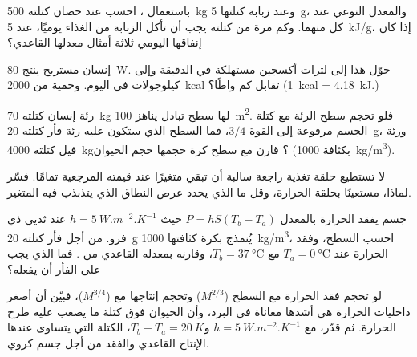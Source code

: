 \begin{exercise}[$\star\star$]\label{exo:b1:organism-environment:6}
باستعمال ، احسب  عند حصان كتلته
\qty{500}{kg} وعند زبابة كتلتها \qty{5}{g}، والمعدل النوعي عند كل
منهما. وكم مرة من كتلته يجب أن تأكل الزبابة من الغذاء يوميًا، عند
\qty{5}{kJ/g}، إذا كان إنفاقها اليومي ثلاثة أمثال معدلها القاعدي؟
\end{exercise}

\begin{exercise}[$\star\star$]\label{exo:b1:organism-environment:7}
إنسان مستريح ينتج \qty{80}{W}. حوّل هذا إلى لترات أكسجين مستهلكة في
الدقيقة وإلى كيلوجولات في اليوم. وحمية من \qty{2000}{kcal} تقابل كم
واطًا؟ (\qty{1}{kcal} = \qty{4.18}{kJ}.)
\end{exercise}

\begin{exercise}[$\star\star$]\label{exo:b1:organism-environment:8}
رئة إنسان كتلته \qty{70}{kg} لها سطح تبادل يناهز \qty{100}{m^2}.
فلو تحجم سطح الرئة مع كتلة الجسم مرفوعة إلى القوة $3/4$، فما السطح
الذي ستكون عليه رئة فأر كتلته \qty{20}{g}، ورئة فيل كتلته
\qty{4000}{kg}؟ قارن مع سطح كرة حجمها حجم الحيوان (بكثافة
\qty{1000}{kg/m^3}).
\end{exercise}

\begin{exercise}[$\star\star$]\label{exo:b1:organism-environment:9}
لا تستطيع حلقة تغذية راجعة سالبة أن تبقي متغيرًا عند قيمته المرجعية
تمامًا. فسّر لماذا، مستعينًا بحلقة الحرارة، وقل ما الذي يحدد عرض
النطاق الذي يتذبذب فيه المتغير.
\end{exercise}

\begin{exercise}[$\star\star\star$]\label{exo:b1:organism-environment:10}
جسم يفقد الحرارة بالمعدل $P = hS(T_b - T_a)$ حيث
$h = \qty{5}{W.m^{-2}.K^{-1}}$ عند ثديي ذي فرو. من أجل فأر كتلته
\qty{20}{g} يُنمذج بكرة كثافتها \qty{1000}{kg/m^3}، احسب السطح،
وفقد الحرارة عند $T_a = \qty{0}{\celsius}$ مع $T_b =
\qty{37}{\celsius}$، وقارنه بمعدله القاعدي من .
فما الذي يجب على الفأر أن يفعله؟
\end{exercise}

\begin{exercise}[$\star\star\star$]\label{exo:b1:organism-environment:11}
لو تحجم فقد الحرارة مع السطح ($M^{2/3}$) وتحجم إنتاجها مع  ($M^{3/4}$)، فبيّن أن أصغر داخليات الحرارة هي أشدها معاناة
في البرد، وأن الحيوان فوق كتلة ما يصعب عليه طرح الحرارة. ثم قدّر،
مع $h = \qty{5}{W.m^{-2}.K^{-1}}$ و$T_b - T_a = \qty{20}{K}$،
الكتلة التي يتساوى عندها الإنتاج القاعدي والفقد من أجل جسم كروي.
\end{exercise}

